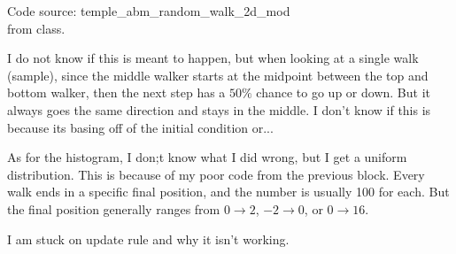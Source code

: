 \documentclass[12pt]{article}
\newenvironment{exercise}[2][Exercise]{\begin{trivlist}
\item[\hskip \labelsep {\bfseries #1}\hskip \labelsep {\bfseries #2.}]}{\end{trivlist}}
\begin{document}
Code source: temple\_abm\_random\_walk\_2d\_mod\\
from class.

\begin{exercise}{Analysis of (b)}
\end{exercise}
I do not know if this is meant to happen, but when looking at a single walk (sample), since the middle walker starts at the midpoint 
between the top and bottom walker, then the next step has a $50\%$ chance to go up or down. But it always goes the same 
direction and stays in the middle. I don't know if this is because its basing off of the initial condition or...

As for the histogram, I don;t know what I did wrong, but I get a uniform distribution. This is because of my poor code from the 
previous block. Every walk ends in a specific final position, and the number is usually 100 for each. But the final position generally 
ranges from $0\to 2$, $-2\to 0$, or $0\to 16$. 


\begin{exercise}{Analysis of (c)}
\end{exercise}

I am stuck on update rule and why it isn't working.
\end{document}
